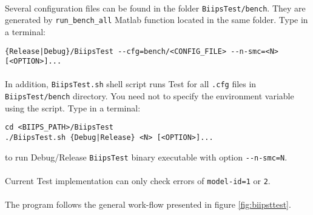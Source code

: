 \paragraph{}
Several configuration files can be found in the folder \texttt{BiipsTest/bench}. They are generated by \texttt{run\_bench\_all} Matlab function located in the same folder. Type in a terminal:
\begin{verbatim}
{Release|Debug}/BiipsTest --cfg=bench/<CONFIG_FILE> --n-smc=<N> [<OPTION>]...
\end{verbatim}

\paragraph{}
In addition, \texttt{BiipsTest.sh} shell script runs \biips Test for all \texttt{.cfg} files in \texttt{BiipsTest/bench} directory. You need not to specify the environment variable using the script. Type in a terminal:
\begin{verbatim}
cd <BIIPS_PATH>/BiipsTest
./BiipsTest.sh {Debug|Release} <N> [<OPTION>]...
\end{verbatim}
to run Debug/Release \texttt{BiipsTest} binary executable with option \verb!--n-smc=N!.

\paragraph{}
Current \biips Test implementation can only check errors of \verb!model-id=1! or \verb!2!.

\paragraph{}
The program follows the general work-flow presented in figure \ref{fig:biipsttest}.


